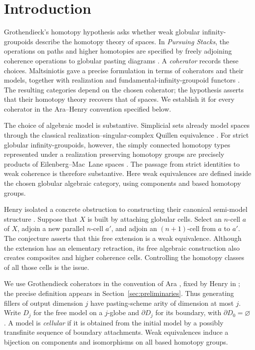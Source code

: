 \section{Introduction}\label{sec:introduction}

Grothendieck's homotopy hypothesis asks whether weak globular
infinity-groupoids describe the homotopy theory of spaces.  In
\emph{Pursuing Stacks}, the operations on paths and higher homotopies
are specified by freely adjoining coherence operations to globular
pasting diagrams \cite[Sections~9 and~12--13]{Grothendieck1983}.
A \emph{coherator} records these choices.  Maltsiniotis gave a precise
formulation in terms of coherators and their models, together with
realization and fundamental-infinity-groupoid functors
\cite{Maltsiniotis2007,Maltsiniotis2010}.
The resulting categories depend on the chosen coherator; the hypothesis
asserts that their homotopy theory recovers that of spaces.
We establish it for every coherator in the Ara--Henry convention
specified below.

The choice of algebraic model is substantive.  Simplicial sets already
model spaces through the classical realization--singular-complex
Quillen equivalence \cite[Theorem~3.6.7]{Hovey1999}.
For strict globular infinity-groupoids, however, the simply connected
homotopy types represented under a realization preserving homotopy
groups are precisely products of Eilenberg--Mac~Lane spaces \cite[Theorem~5.4]{AraStrict2013}.
The passage from strict identities to weak coherence is therefore
substantive.  Here weak equivalences are defined
inside the chosen globular algebraic category, using components and
based homotopy groups.

Henry isolated a concrete obstruction to constructing their canonical
semi-model structure \cite[Conjecture~5.3.3]{Henry2016}.  Suppose that \(X\)
is built by attaching globular cells.  Select an \(n\)-cell \(a\) of \(X\),
adjoin a new parallel \(n\)-cell \(a'\), and adjoin an \((n+1)\)-cell from
\(a\) to \(a'\).  The conjecture asserts that this free extension is a weak
equivalence.  Although the extension has an elementary retraction, its
free algebraic construction also creates composites and higher coherence
cells.  Controlling the homotopy classes of all those cells is the issue.

We use Grothendieck coherators in the convention of Ara
\cite[Sections~2.3 and~2.9--2.11]{Ara2013}, fixed by Henry in
\cite[Section~5.3]{Henry2016}; the precise definition appears in
Section~\ref{sec:preliminaries}.  Thus generating fillers of output
dimension \(j\) have pasting-scheme arity of dimension at most \(j\).
Write \(D_j\) for the free model on a \(j\)-globe and \(\partial D_j\)
for its boundary, with \(\partial D_0=\varnothing\).
A model is \emph{cellular} if it is obtained from the initial model by
a possibly transfinite sequence of boundary attachments.
Weak equivalences induce a bijection on components and isomorphisms on
all based homotopy groups.

